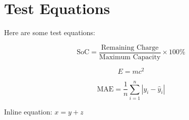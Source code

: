 \documentclass{article}
\begin{document}
\section{Test Equations}

Here are some test equations:

\begin{equation}
\text{SoC} = \frac{\text{Remaining Charge}}{\text{Maximum Capacity}} \times 100\%
\end{equation}

\begin{equation}
E = mc^2
\end{equation}

\begin{equation}
\text{MAE} = \frac{1}{n} \sum_{i=1}^{n} |y_i - \hat{y}_i|
\end{equation}

Inline equation: $x = y + z$
\end{document}
